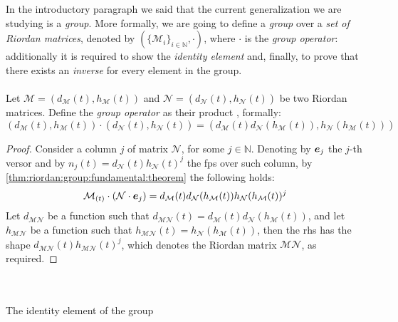 In the introductory paragraph we said that the current generalization
we are studying is a \emph{group}. More formally, we are going to define a 
\emph{group} over a \emph{set of Riordan matrices}, 
denoted by $(\lbrace \mathcal{M}_{i}\rbrace_{i\in\mathbb{N}},\cdot)$, 
where $\cdot$ is the \emph{group
operator}: additionally it is required to show the \emph{identity element} and,
finally, to prove that there exists an \emph{inverse} for every element in the group.
\\\\
Let $\mathcal{M}=\left(d_{\mathcal{M}}(t),h_{\mathcal{M}}(t)\right)$ and
$\mathcal{N}=\left(d_{\mathcal{N}}(t),h_{\mathcal{N}}(t)\right)$ be two Riordan matrices.
Define the \emph{group operator} as their product
, formally:
\begin{displaymath}
    \left(d_{\mathcal{M}}(t),h_{\mathcal{M}}(t)\right)\cdot
        \left(d_{\mathcal{N}}(t),h_{\mathcal{N}}(t)\right) = 
        \left(d_{\mathcal{M}}(t)d_{\mathcal{N}}(h_{\mathcal{M}}(t)),
            h_{\mathcal{N}}(h_{\mathcal{M}}(t))\right)
\end{displaymath}
\begin{proof}
    Consider a column $j$ of matrix $\mathcal{N}$,
    for some $j\in\mathbb{N}$. Denoting by $\boldsymbol{e}_{j}$ the $j$-th versor and
    by $n_{j}(t)=d_{\mathcal{N}}(t)h_{\mathcal{N}}(t)^{j}$ the \ac{fps} over such column, 
    by \autoref{thm:riordan:group:fundamental:theorem} the following holds:
    \begin{displaymath}
        \mathcal{M}_{(t)}\cdot\left(\mathcal{N}\cdot\boldsymbol{e}_{j}\right)
            = d_{\mathcal{M}}(t) d_{\mathcal{N}}(h_{\mathcal{M}}(t))
                h_{\mathcal{N}}(h_{\mathcal{M}}(t))^{j}
    \end{displaymath}
    Let $d_{\mathcal{M}\mathcal{N}}$ be a function such that 
    $d_{\mathcal{M}\mathcal{N}}(t)=d_{\mathcal{M}}(t) d_{\mathcal{N}}( h_{\mathcal{M}}(t))$,
    and let $h_{\mathcal{M}\mathcal{N}}$ be a function such that 
    $h_{\mathcal{M}\mathcal{N}}(t)=h_{\mathcal{N}}(h_{\mathcal{M}}(t))$, then the \ac{rhs}
    has the shape
    $d_{\mathcal{M}\mathcal{N}}(t)h_{\mathcal{M}\mathcal{N}}(t)^{j}$, which denotes the
    Riordan matrix $\mathcal{M}\mathcal{N}$, as required.

\end{proof}
\quad
\\\\
The  identity element of the group
